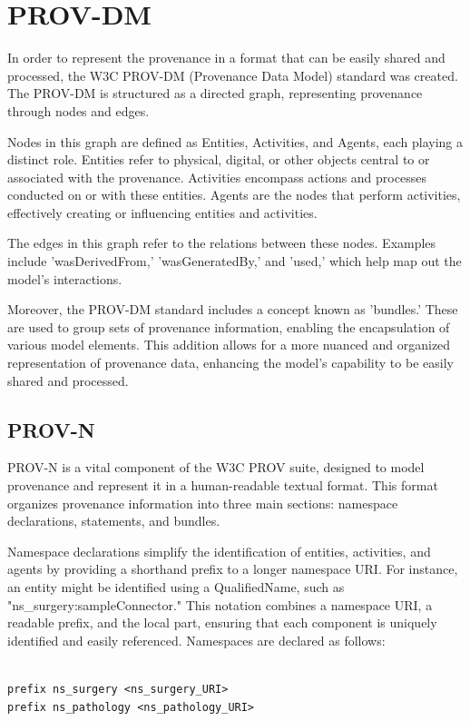 \documentclass[
  digital,     %
  oneside,     %
  nosansbold,  %
  nocolorbold, %
  lof,         %
  lot,         %
]{fithesis4}
\begin{document}
\section{PROV-DM}
\shorthandoff{-}
In order to represent the provenance in a format that can be easily shared and processed, the W3C PROV-DM (Provenance Data Model) standard was created. The PROV-DM is structured as a directed graph, representing provenance through nodes and edges. 

Nodes in this graph are defined as Entities, Activities, and Agents, each playing a distinct role. Entities refer to physical, digital, or other objects central to or associated with the provenance. Activities encompass actions and processes conducted on or with these entities. Agents are the nodes that perform activities, effectively creating or influencing entities and activities.

The edges in this graph refer to the relations between these nodes. Examples include 'wasDerivedFrom,' 'wasGeneratedBy,' and 'used,' which help map out the model's interactions.

Moreover, the PROV-DM standard includes a concept known as 'bundles.' These are used to group sets of provenance information, enabling the encapsulation of various model elements. This addition allows for a more nuanced and organized representation of provenance data, enhancing the model's capability to be easily shared and processed.
\shorthandon{-}

\subsection{PROV-N}
\shorthandoff{-}
PROV-N is a vital component of the W3C PROV suite, designed to model provenance and represent it in a human-readable textual format. This format organizes provenance information into three main sections: namespace declarations, statements, and bundles. 

Namespace declarations simplify the identification of entities, activities, and agents by providing a shorthand prefix to a longer namespace URI. For instance, an entity might be identified using a QualifiedName, such as "ns\_surgery:sampleConnector." This notation combines a namespace URI, a readable prefix, and the local part, ensuring that each component is uniquely identified and easily referenced. Namespaces are declared as follows:

\begin{verbatim}

prefix ns_surgery <ns_surgery_URI>
prefix ns_pathology <ns_pathology_URI>

\end{verbatim}
\end{document}
